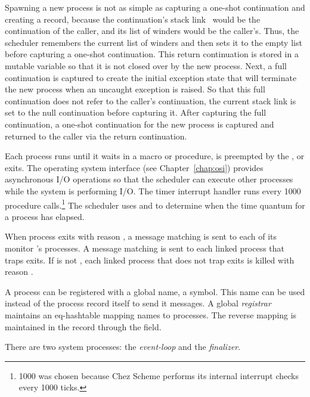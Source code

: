 Spawning a new process is not as simple as capturing a one-shot
continuation and creating a  record, because the
continuation's stack link~\cite{representing-control} would be the
continuation of the caller, and its list of winders would be the
caller's. Thus, the scheduler remembers the current list of winders
and then sets it to the empty list before capturing a one-shot
continuation.  This return continuation is stored in a mutable
variable so that it is not closed over by the new process.  Next, a
full continuation is captured to create the initial exception state
that will terminate the new process when an uncaught exception is
raised. So that this full continuation does not refer to the caller's
continuation, the current stack link is set to the null continuation
before capturing it. After capturing the full continuation, a one-shot
continuation for the new process is captured and returned to the
caller via the return continuation.

Each process runs until it waits in a  macro or
 procedure, is preempted by the
, or exits.  The operating system
interface (see Chapter~\ref{chap:osi}) provides asynchronous I/O
operations so that the scheduler can execute other processes while the
system is performing I/O.  The timer interrupt handler runs every 1000
procedure calls.\footnote{1000 was chosen because Chez Scheme performs
  its internal interrupt checks every 1000 ticks.} The scheduler uses
 and  to determine when
the time quantum for a process has elapsed.

When process  exits with reason , a message matching
 is sent to each of its
monitor 's  processes.  A message matching
 is sent to each linked process that
traps exits. If  is not , each linked process
that does not trap exits is killed with reason .

A process can be registered with a global name, a symbol. This name
can be used instead of the process record itself to send it messages.
A global \emph{registrar} maintains an eq-hashtable
mapping names to processes. The reverse mapping is maintained in the
 record through the  field.

There are two system processes: the
\emph{event-loop}\label{page:event-loop} and the
\emph{finalizer}.

